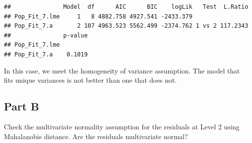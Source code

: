 \documentclass[]{article}
\newenvironment{Shaded}{\begin{snugshade}}{\end{snugshade}}
\newcommand{\KeywordTok}[1]{\textcolor[rgb]{0.13,0.29,0.53}{\textbf{#1}}}
\newcommand{\DataTypeTok}[1]{\textcolor[rgb]{0.13,0.29,0.53}{#1}}
\newcommand{\DecValTok}[1]{\textcolor[rgb]{0.00,0.00,0.81}{#1}}
\newcommand{\StringTok}[1]{\textcolor[rgb]{0.31,0.60,0.02}{#1}}
\newcommand{\OperatorTok}[1]{\textcolor[rgb]{0.81,0.36,0.00}{\textbf{#1}}}
\newcommand{\NormalTok}[1]{#1}
\begin{document}
\begin{verbatim}
##               Model  df      AIC      BIC    logLik   Test  L.Ratio
## Pop_Fit_7.lme     1   8 4882.758 4927.541 -2433.379                
## Pop_Fit_7.a       2 107 4963.523 5562.499 -2374.762 1 vs 2 117.2343
##               p-value
## Pop_Fit_7.lme        
## Pop_Fit_7.a    0.1019
\end{verbatim}

In this case, we meet the homogeneity of variance assumption. The model
that fits unique variances is not better than one that does not.

\subsection{Part B}\label{part-b-4}

Check the multivariate normality assumption for the residuals at Level 2
using Mahalanobis distance. Are the residuals multivariate normal?

\begin{Shaded}
\end{Shaded}
\end{document}

